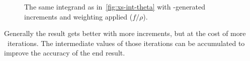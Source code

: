 \begin{figure}[ht]
  \centering {}
  \caption[\(2\pi\dv{\sigma}{\theta}\) with integration
  boundaries]{\label{fig:xs-int-vegas} The same integrand as
    in~\ref{fig:xs-int-theta} with \vegas-generated increments and
    weighting applied (\(f/\rho\)).}
\end{figure}

Generally the result gets better with more increments, but at the cost
of more \vegas\ iterations. The intermediate values of those
iterations can be accumulated to improve the accuracy of the end
result.~\cite[197]{Lepage:19781an}
